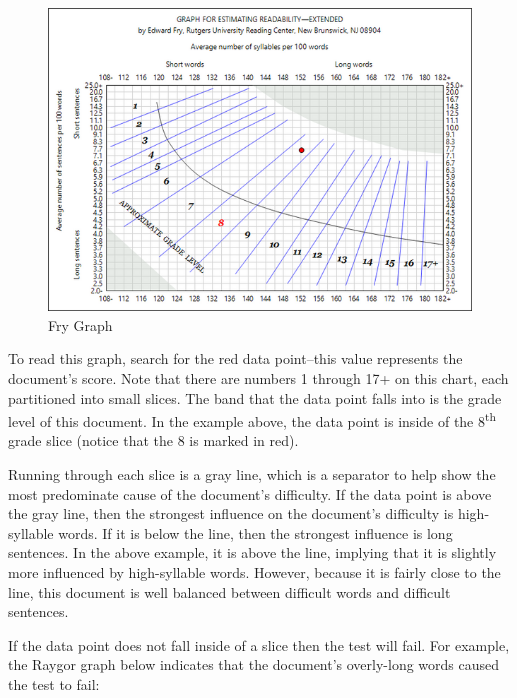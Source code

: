 \documentclass[
]{book}
\theoremstyle{definition}
\theoremstyle{definition}
\theoremstyle{definition}
\theoremstyle{definition}
\theoremstyle{remark}
\begin{document}
\begin{figure}[H]

{\centering \includegraphics[width=0.75\linewidth,]{Images/frygraph} 

}

\caption{Fry Graph}\label{fig:fryGraph2}
\end{figure}

To read this graph, search for the red data point--this value represents the document's score. Note that there are numbers 1 through 17+ on this chart, each partitioned into small slices. The band that the data point falls into is the grade level of this document. In the example above, the data point is inside of the 8\textsuperscript{th} grade slice (notice that the 8 is marked in red).

Running through each slice is a gray line, which is a separator to help show the most predominate cause of the document's difficulty. If the data point is above the gray line, then the strongest influence on the document's difficulty is high-syllable words. If it is below the line, then the strongest influence is long sentences. In the above example, it is above the line, implying that it is slightly more influenced by high-syllable words. However, because it is fairly close to the line, this document is well balanced between difficult words and difficult sentences.

If the data point does not fall inside of a slice then the test will fail. For example, the Raygor graph below indicates that the document's overly-long words caused the test to fail:
\end{document}
